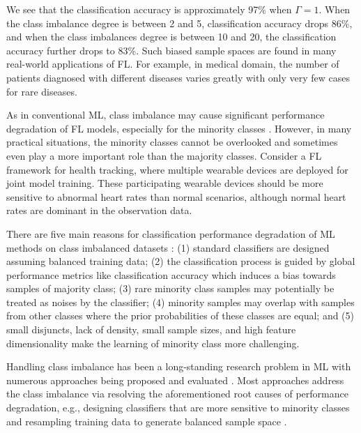 \documentclass[10pt,journal,compsoc]{IEEEtran}
\begin{document}
We see that the classification accuracy is approximately 97\% when $\Gamma=1$. When the class imbalance degree is between 2 and 5, classification accuracy drops 86\%, and when the class imbalances degree is between 10 and 20, the classification accuracy further drops to 83\%. Such biased sample spaces are found in many real-world applications of FL. For example, in medical domain, the number of patients diagnosed with different diseases varies greatly \cite{dong2019semantic} with only very few cases for rare diseases.

As in conventional ML, class imbalance may cause significant performance degradation of FL models, especially for the minority classes \cite{mou2021optimized} \cite{li2021sample} \cite{duan2020self} \cite{zhang2021dubhe}. However, in many practical situations, the minority classes cannot be overlooked and sometimes even play a more important role than the majority classes. Consider a FL framework for health tracking, where multiple wearable devices are deployed for joint model training. These participating wearable devices should be more sensitive to abnormal heart rates than normal scenarios, although normal heart rates are dominant in the observation data. 

There are five main reasons for classification performance degradation of ML methods on class imbalanced datasets \cite{haixiang2017learning}: (1) standard classifiers are designed assuming balanced training data; (2) the classification process is guided by global performance metrics like classification accuracy which induces a bias towards samples of majority class; (3) rare minority class samples may potentially be treated as noises by the classifier; (4) minority samples may overlap with samples from other classes where the prior probabilities of these classes are equal; and (5) small disjuncts, lack of density, small sample sizes, and high feature dimensionality make the learning of minority class more challenging.

Handling class imbalance has been a long-standing research problem in ML with numerous approaches being proposed and evaluated \cite{krawczyk2016learning}. Most approaches address the class imbalance via resolving the aforementioned root causes of performance degradation, e.g., designing classifiers that are more sensitive to minority classes and resampling training data to generate balanced sample space \cite{galar2011review} \cite{krawczyk2014cost} \cite{loyola2016study}. 
\end{document}
